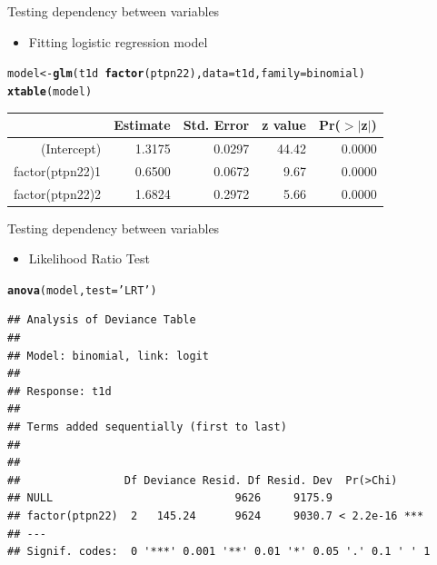 \documentclass{beamer}\usepackage[]{graphicx}\usepackage[]{color}
\makeatletter
\newcommand{\hlstr}[1]{\textcolor[rgb]{0.192,0.494,0.8}{#1}}%
\newcommand{\hlopt}[1]{\textcolor[rgb]{0,0,0}{#1}}%
\newcommand{\hlstd}[1]{\textcolor[rgb]{0.345,0.345,0.345}{#1}}%
\newcommand{\hlkwb}[1]{\textcolor[rgb]{0.69,0.353,0.396}{#1}}%
\newcommand{\hlkwc}[1]{\textcolor[rgb]{0.333,0.667,0.333}{#1}}%
\newcommand{\hlkwd}[1]{\textcolor[rgb]{0.737,0.353,0.396}{\textbf{#1}}}%
\newenvironment{kframe}{%
 \def\at@end@of@kframe{}%
 \ifinner\ifhmode%
  \def\at@end@of@kframe{\end{minipage}}%
  \begin{minipage}{\columnwidth}%
 \fi\fi%
 \def\FrameCommand##1{\hskip\@totalleftmargin \hskip-\fboxsep
 \colorbox{shadecolor}{##1}\hskip-\fboxsep
     \hskip-\linewidth \hskip-\@totalleftmargin \hskip\columnwidth}%
 \MakeFramed {\advance\hsize-\width
   \@totalleftmargin\z@ \linewidth\hsize
   \@setminipage}}%
 {\par\unskip\endMakeFramed%
 \at@end@of@kframe}
\newenvironment{knitrout}{}{} %
\makeatother
\begin{document}
\begin{frame}[fragile]{Testing dependency between variables}
  \begin{itemize}
    \item Fitting logistic regression model
  \end{itemize}
\begin{kframe}
\begin{alltt}
\hlstd{model} \hlkwb{<-} \hlkwd{glm}\hlstd{(t1d} \hlopt{~} \hlkwd{factor}\hlstd{(ptpn22),} \hlkwc{data}\hlstd{=t1d,} \hlkwc{family}\hlstd{=binomial)}
\hlkwd{xtable}\hlstd{(model)}
\end{alltt}
\end{kframe}%
\begin{table}[ht]
\centering
\begin{tabular}{rrrrr}
  \hline
 & Estimate & Std. Error & z value & Pr($>$$|$z$|$) \\ 
  \hline
(Intercept) & 1.3175 & 0.0297 & 44.42 & 0.0000 \\ 
  factor(ptpn22)1 & 0.6500 & 0.0672 & 9.67 & 0.0000 \\ 
  factor(ptpn22)2 & 1.6824 & 0.2972 & 5.66 & 0.0000 \\ 
   \hline
\end{tabular}
\end{table}

\end{frame}

\begin{frame}[fragile]{Testing dependency between variables}
  \begin{itemize}
    \item Likelihood Ratio Test
  \end{itemize}
\begin{knitrout}\tiny
{}\color{fgcolor}\begin{kframe}
\begin{alltt}
\hlkwd{anova}\hlstd{(model,} \hlkwc{test}\hlstd{=}\hlstr{'LRT'}\hlstd{)}
\end{alltt}
\begin{verbatim}
## Analysis of Deviance Table
## 
## Model: binomial, link: logit
## 
## Response: t1d
## 
## Terms added sequentially (first to last)
## 
## 
##                Df Deviance Resid. Df Resid. Dev  Pr(>Chi)    
## NULL                            9626     9175.9              
## factor(ptpn22)  2   145.24      9624     9030.7 < 2.2e-16 ***
## ---
## Signif. codes:  0 '***' 0.001 '**' 0.01 '*' 0.05 '.' 0.1 ' ' 1
\end{verbatim}
\end{kframe}
\end{knitrout}
\end{frame}
\end{document}
